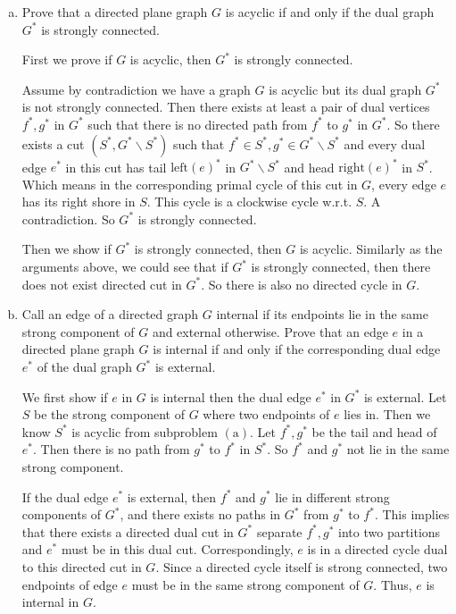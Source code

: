 \documentclass[11pt]{article}
\begin{document}
\begin{enumerate}[(a)]
\item Prove that a directed plane graph \(G\) is acyclic if and only if the dual graph \(G^*\) is strongly connected.
  \begin{solution}
    First we prove if \(G\) is acyclic, then \(G^*\) is strongly connected.

    Assume by contradiction we have a graph \(G\) is acyclic but its dual graph \(G^*\) is not strongly connected.
    Then there exists at least a pair of dual vertices \(f^*,g^*\) in \(G^*\) such that there is no directed path from \(f^*\) to \(g^*\) in \(G^*\). So there exists a cut \((S^*,G^*\backslash S^*)\) such that \(f^*\in S^*, g^*\in G^*\backslash S^*\) and every dual edge \(e^*\) in this cut has tail \(\mathrm{left}(e)^*\) in \(G^*\backslash S^*\) and head \(\mathrm{right}(e)^*\) in \(S^*\). Which means in the corresponding primal cycle of this cut in \(G\), every edge \(e\) has its right shore in \(S\). This cycle is a clockwise cycle w.r.t. \(S\). A contradiction. So \(G^*\) is strongly connected.

    Then we show if \(G^*\) is strongly connected, then \(G\) is acyclic. Similarly as the arguments above, we could see that if \(G^*\) is strongly connected, then there does not exist directed cut in \(G^*\). So there is also no directed cycle in \(G\).

  \end{solution}
\item Call an edge of a directed graph \(G\) internal if its endpoints lie in the same strong component of \(G\) and external otherwise. Prove that an edge \(e\) in a directed plane graph \(G\) is internal if and only if the corresponding dual edge \(e^*\) of the dual graph \(G^*\) is external.
  \begin{solution}
    We first show if \(e\) in \(G\) is internal then the dual edge \(e^*\) in \(G^*\) is external.
    Let \(S\) be the strong component of \(G\) where two endpoints of \(e\) lies in. Then we know \(S^*\) is acyclic from subproblem \((\mathrm{a})\).
    Let \(f^*,g^*\) be the tail and head of \(e^*\). Then there is no path from \(g^*\) to \(f^*\) in \(S^*\). So \(f^*\) and \(g^*\) not lie in the same strong component.

    If the dual edge \(e^*\) is external, then \(f^*\) and \(g^*\) lie in different strong components of \(G^*\), and there exists no paths in \(G^*\) from \(g^*\) to \(f^*\). This implies that there exists a directed dual cut in \(G^*\) separate \(f^*, g^*\) into two partitions and \(e^*\) must be in this dual cut. Correspondingly, \(e\) is in a directed cycle dual to this directed cut in \(G\). Since a directed cycle itself is strong connected, two endpoints of edge \(e\) must be in the same strong component of \(G\). Thus, \(e\) is internal in \(G\).

  \end{solution}

\end{enumerate}
\end{document}
